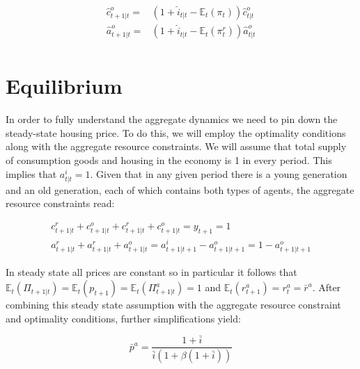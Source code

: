 \documentclass{article}
\begin{document}
\begin{align}
    \hat{c}^o_{t+1|t} =& (1 + \hat{i}_{t|t} - \mathbb{E}_t(\pi_t))\hat{c}^o_{t|t} \\
    \hat{a}^o_{t+1|t} =& (1 + \hat{i}_{t|t} - \mathbb{E}_t(\pi^r_t))\hat{a}^o_{t|t} \\
\end{align}

\section{Equilibrium}

In order to fully understand the aggregate dynamics we need to pin down the steady-state housing price. To do this, we will employ the optimality conditions along with the aggregate resource constraints. We will assume that total supply of consumption goods and housing in the economy is 1 in every period. This implies that $a^i_{t|t} = 1$.  Given that in any given period there is a young generation and an old generation, each of which contains both types of agents, the aggregate resource constraints read:

\begin{align}
    c^r_{t+1|t} + c^o_{t+1|t} + c^r_{t+1|t} + c^o_{t+1|t} = y_{t+1} = 1 \label{consumption_rc} \\
    a^r_{t+1|t} + a^r_{t+1|t} + a^o_{t+1|t} = a^i_{t+1|t+1} - a^o_{t+1|t+1} = 1 - a^o_{t+1|t+1} \label{housing_rc}
\end{align}

In steady state all prices are constant so in particular it follows that $\mathbb{E}_t(\Pi_{t+1|t}) = \mathbb{E}_t(p_{t+1}) = \mathbb{E}_t(\Pi^a_{t+1|t}) = 1$ and $\mathbb{E}_t({r^a_{t+1}}) = r^a_t = \bar{r}^a$. After combining this steady state assumption with the aggregate resource constraint and optimality conditions, further simplifications yield:

\begin{equation}
    \bar{p}^a = \frac{1 + \bar{i}}{\bar{i}(1 + \beta(1 + \bar{i}))} \label{ss_housing_price}
\end{equation} 
\end{document}
